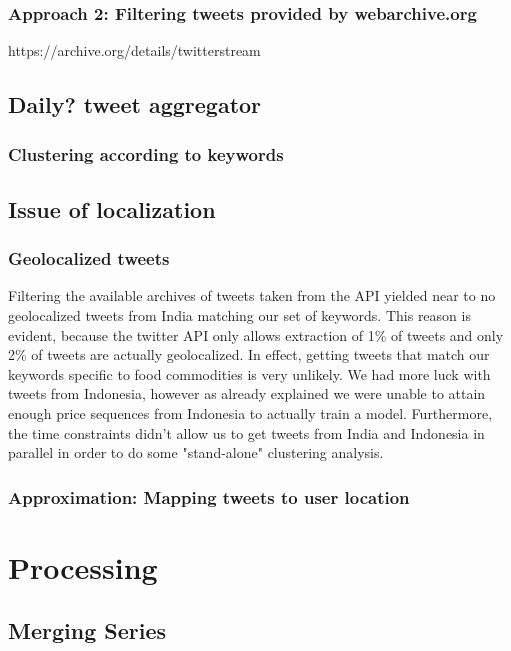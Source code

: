 \subsubsection*{Approach 2: Filtering tweets provided by webarchive.org}
https://archive.org/details/twitterstream

\subsection*{Daily? tweet aggregator}

\subsubsection*{Clustering according to keywords}

\subsection*{Issue of localization}

\subsubsection*{Geolocalized tweets}
Filtering the available archives of tweets taken from the API yielded near to no geolocalized tweets from India matching our set of keywords. This reason is evident, because the twitter API only allows extraction of 1\% of tweets and only 2\% of tweets are actually geolocalized. In effect, getting tweets that match our keywords specific to food commodities is very unlikely. We had more luck with tweets from Indonesia, however as already explained we were unable to attain enough price sequences from Indonesia to actually train a model. Furthermore, the time constraints didn't allow us to get tweets from India and Indonesia in parallel in order to do some "stand-alone" clustering analysis.

\subsubsection*{Approximation: Mapping tweets to user location}


\section*{Processing}

\subsection*{Merging Series}

